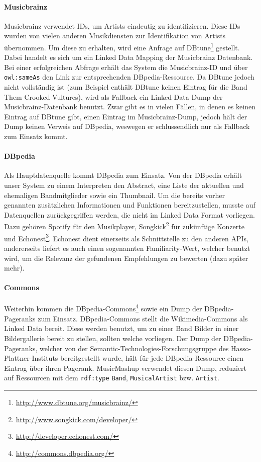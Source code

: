 \paragraph{Musicbrainz} Musicbrainz verwendet IDs, um Artists eindeutig zu identifizieren. Diese IDs wurden von vielen anderen Musikdiensten zur Identifikation von Artists übernommen. Um diese zu erhalten, wird eine Anfrage auf DBtune\footnote{\url{http://www.dbtune.org/musicbrainz/}} gestellt. Dabei handelt es sich um ein Linked Data Mapping der Musicbrainz Datenbank. Bei einer erfolgreichen Abfrage erhält das System die Musicbrainz-ID und über \texttt{owl:sameAs} den Link zur entsprechenden DBpedia-Ressource. Da DBtune jedoch nicht vollständig ist (zum Beispiel enthält DBtune keinen Eintrag für die Band \glqq Them Crooked Vultures\grqq), wird als Fallback ein Linked Data Dump der Musicbrainz-Datenbank benutzt. Zwar gibt es in vielen Fällen, in denen es keinen Eintrag auf DBtune gibt, einen Eintrag im Musicbrainz-Dump, jedoch hält der Dump keinen Verweis auf DBpedia, weswegen er schlussendlich nur als Fallback zum Einsatz kommt.

\paragraph{DBpedia} Als Hauptdatenquelle kommt DBpedia zum Einsatz. Von der DBpedia erhält unser System zu einem Interpreten den Abstract, eine Liste der aktuellen und ehemaligen Bandmitglieder sowie ein Thumbnail. Um die bereits vorher genannten zusätzlichen Informationen und Funktionen bereitzustellen, musste auf Datenquellen zurückgegriffen werden, die nicht im Linked Data Format vorliegen. Dazu gehören Spotify für den Musikplayer, Songkick\footnote{\url{http://www.songkick.com/developer/}} für zukünftige Konzerte und Echonest\footnote{\url{http://developer.echonest.com/}}. Echonest dient einerseits als Schnittstelle zu den anderen APIs, andererseits liefert es auch einen sogenannten \glqq Familiarity\grqq-Wert, welcher benutzt wird, um die Relevanz der gefundenen Empfehlungen zu bewerten (dazu später mehr).

\paragraph{Commons} Weiterhin kommen die DBpedia-Commons\footnote{\url{http://commons.dbpedia.org/}} sowie ein Dump der DBpedia-Pageranks \cite{dbpedia-graphmeasures} zum Einsatz. DBpedia-Commons stellt die Wikimedia-Commons als Linked Data bereit. Diese werden benutzt, um zu einer Band Bilder in einer Bildergallerie bereit zu stellen, sollten welche vorliegen. 
Der Dump der DBpedia-Pageranks, welcher von der Semantic-Technologies-Forschungsgruppe des Hasso-Plattner-Instituts bereitgestellt wurde, hält für jede DBpedia-Ressource einen Eintrag über ihren Pagerank. MusicMashup verwendet diesen Dump, reduziert auf Ressourcen mit dem \texttt{rdf:type} \texttt{Band}, \texttt{MusicalArtist} bzw. \texttt{Artist}.

